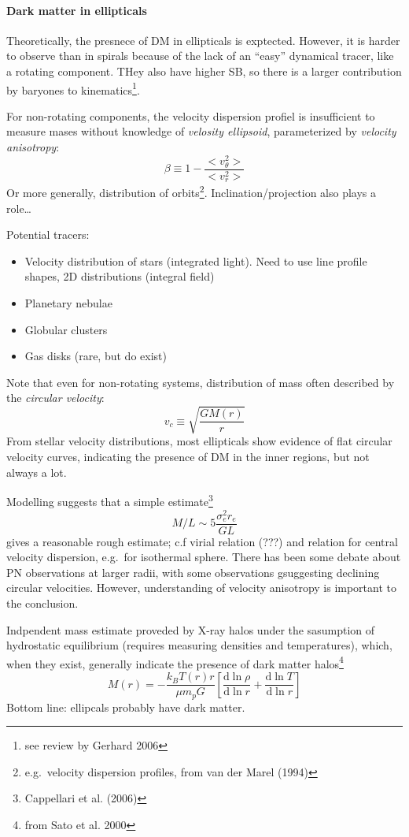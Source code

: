 \documentclass{article}
\newcommand{\mynotes}[1]{\textcolor{cadmiumorange}{#1}}
\begin{document}
\paragraph{Dark matter in ellipticals}
Theoretically, the presnece of DM in ellipticals is exptected. However, it
is harder to observe than in spirals because of the lack of an ``easy''
dynamical tracer, like a rotating component. THey also have higher SB,
so there is a larger contribution by baryones to kinematics\footnote{see
review by Gerhard 2006}.

For non-rotating components, the velocity dispersion profiel is insufficient
to measure mases without knowledge of \textit{velosity ellipsoid},
parameterized by \textit{velocity anisotropy}:
\[
    \beta \equiv 1 - \frac{<v_{\theta}^{2}>}{<v_{r}^{2}>}
    \]
Or more generally, distribution of orbits\footnote{e.g.\ velocity dispersion
profiles, from van der Marel (1994)}. Inclination/projection also plays a
role\ldots

Potential tracers:
\begin{itemize}
    \item Velocity distribution of stars (integrated light). Need to use
        line profile shapes, 2D distributions (integral field)
    \item Planetary nebulae
    \item Globular clusters
    \item Gas disks (rare, but do exist)
\end{itemize}
Note that even for non-rotating systems, distribution of mass often described
by the \textit{circular velocity}:
\[
    v_{c} \equiv \sqrt{\frac{GM(r)}{r}}
    \]
From stellar velocity distributions, most ellipticals show evidence of
flat circular velocity curves, indicating the presence of DM in the inner
regions, but not always a lot.

Modelling suggests that a simple estimate\footnote{Cappellari et al. (2006)}
\[
    M/L \sim 5\frac{\sigma_{e}^{2}r_{e}}{GL}
    \]
gives a reasonable rough estimate; c.f virial relation \mynotes{(???)}
and relation for
central velocity dispersion, e.g.\ for isothermal sphere.
There has been some debate about PN observations at larger radii, with some
observations gsuggesting declining circular velocities. However, understanding
of velocity anisotropy is important to the conclusion.

Indpendent mass estimate proveded by X-ray halos under the sasumption of
hydrostatic equilibrium (requires measuring densities and temperatures),
which, when they exist, generally indicate the presence of dark matter
halos\footnote{from Sato et al. 2000}
\[
    M(r) = -\frac{k_{B}T(r)r}{{\mu}m_{p}G}
    \left[\frac{\mathrm{d}\ln{\rho}}{\mathrm{d}\ln{r}} +
    \frac{\mathrm{d}\ln{T}}{\mathrm{d}\ln{r}}\right]
    \]
Bottom line: ellipcals probably have dark matter.
\end{document}
